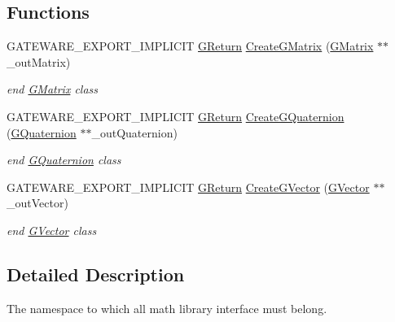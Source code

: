 \subsection*{Functions}
\begin{DoxyCompactItemize}
\item 
\mbox{\label{namespaceGW_1_1MATH_a32e9bb10a0b5fc1b730822ee510d6ce1}} 
G\+A\+T\+E\+W\+A\+R\+E\+\_\+\+E\+X\+P\+O\+R\+T\+\_\+\+I\+M\+P\+L\+I\+C\+IT \hyperlink{namespaceGW_a67a839e3df7ea8a5c5686613a7a3de21}{G\+Return} \hyperlink{namespaceGW_1_1MATH_a32e9bb10a0b5fc1b730822ee510d6ce1}{Create\+G\+Matrix} (\hyperlink{classGW_1_1MATH_1_1GMatrix}{G\+Matrix} $\ast$$\ast$\+\_\+out\+Matrix)
\begin{DoxyCompactList}\small\item\em end \hyperlink{classGW_1_1MATH_1_1GMatrix}{G\+Matrix} class \end{DoxyCompactList}\item 
\mbox{\label{namespaceGW_1_1MATH_a1cb97726e251c442ce358c884f3498a0}} 
G\+A\+T\+E\+W\+A\+R\+E\+\_\+\+E\+X\+P\+O\+R\+T\+\_\+\+I\+M\+P\+L\+I\+C\+IT \hyperlink{namespaceGW_a67a839e3df7ea8a5c5686613a7a3de21}{G\+Return} \hyperlink{namespaceGW_1_1MATH_a1cb97726e251c442ce358c884f3498a0}{Create\+G\+Quaternion} (\hyperlink{classGW_1_1MATH_1_1GQuaternion}{G\+Quaternion} $\ast$$\ast$\+\_\+out\+Quaternion)
\begin{DoxyCompactList}\small\item\em end \hyperlink{classGW_1_1MATH_1_1GQuaternion}{G\+Quaternion} class \end{DoxyCompactList}\item 
\mbox{\label{namespaceGW_1_1MATH_a32dfb827d42ce2d17ed6b4b0e70e4215}} 
G\+A\+T\+E\+W\+A\+R\+E\+\_\+\+E\+X\+P\+O\+R\+T\+\_\+\+I\+M\+P\+L\+I\+C\+IT \hyperlink{namespaceGW_a67a839e3df7ea8a5c5686613a7a3de21}{G\+Return} \hyperlink{namespaceGW_1_1MATH_a32dfb827d42ce2d17ed6b4b0e70e4215}{Create\+G\+Vector} (\hyperlink{classGW_1_1MATH_1_1GVector}{G\+Vector} $\ast$$\ast$\+\_\+out\+Vector)
\begin{DoxyCompactList}\small\item\em end \hyperlink{classGW_1_1MATH_1_1GVector}{G\+Vector} class \end{DoxyCompactList}\end{DoxyCompactItemize}


\subsection{Detailed Description}
The namespace to which all math library interface must belong. 